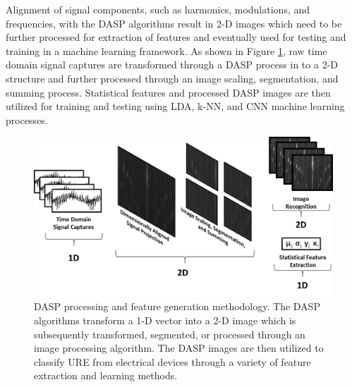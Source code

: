 Alignment of signal components, such as harmonics, modulations, and frequencies, with the DASP algorithms result in 2-D images which need to be further processed for extraction of features and eventually used for testing and training in a machine learning framework.   As shown in Figure \ref{fig:dasp_methodology}, raw time domain signal captures are transformed through a DASP process in to a 2-D structure and further processed through an image scaling, segmentation, and summing process.   Statistical features and processed DASP images are then utilized for training and testing using LDA, k-NN, and CNN machine learning processes.  

\begin{figure}[tb]
	\includegraphics[width=\textwidth]{./model_results/model.jpg}
	\centering
	\caption{DASP processing and feature generation methodology.  The DASP algorithms transform a 1-D vector into a 2-D image which is subsequently transformed, segmented, or processed through an image processing algorithm.  The DASP images are then utilized to classify URE from electrical devices through a variety of feature extraction and learning methods.}
	\label{fig:dasp_methodology}
\end{figure}